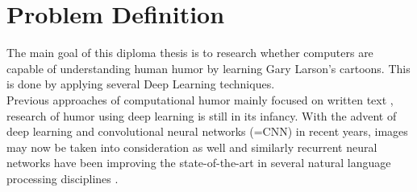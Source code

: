 \documentclass[draft,final]{vutinfth} %
\begin{document}
\frontmatter %

\addstatementpage






\tableofcontents %

\mainmatter

\chapter{Problem Definition}

The main goal of this diploma thesis is to research whether computers are capable of understanding human humor by learning Gary Larson's cartoons. This is done by applying several Deep Learning techniques. \\

Previous approaches of computational humor mainly focused on written text \cite{Yang2015HumorRA}\cite{Bamman2015ContextualizedSD}\cite{HumoristBot}, research of humor using deep learning is still in its infancy. With the advent of deep learning and convolutional neural networks (=CNN) in recent years\cite{Druzhkov2016}, images may now be taken into consideration as well and similarly recurrent neural networks have been improving the state-of-the-art in several natural language processing disciplines \cite{reviewRNN}. \\
\end{document}
